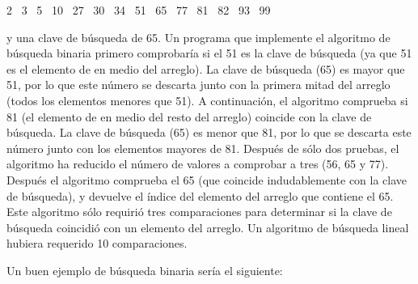 {\centerline{2 \  3 \  5  \ 10 \  27 \  30 \  34 \  51 \  65 \  77 \  81 \  82 \  93 \  99} }

\bigskip
\noindent y una clave de búsqueda de 65. Un programa que implemente el algoritmo de búsqueda binaria primero comprobaría si el 51 es la clave de búsqueda (ya que 51 es el elemento de en medio del arreglo). La clave de búsqueda (65) es mayor que 51, por lo que este número se descarta junto con la primera mitad del arreglo (todos los elementos menores que 51). A continuación, el algoritmo comprueba si 81 (el elemento de en medio del resto del arreglo) coincide con la clave de búsqueda. La clave de búsqueda (65) es menor que 81, por lo que se descarta este número junto con los elementos mayores de 81. Después de sólo dos pruebas, el algoritmo ha reducido el número de valores a comprobar a tres (56, 65 y 77). Después el algoritmo comprueba el 65 (que coincide indudablemente con la clave de búsqueda), y devuelve el índice del elemento del arreglo que contiene el 65. Este algoritmo sólo requirió tres comparaciones para determinar si la clave de búsqueda coincidió con un elemento del arreglo. Un algoritmo de búsqueda lineal hubiera requerido 10 comparaciones.

Un buen ejemplo de búsqueda binaria sería el siguiente:\\
\bigskip



